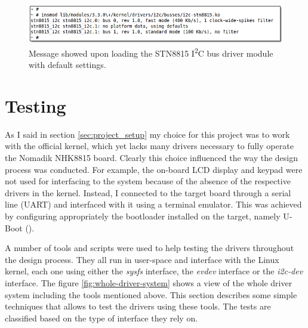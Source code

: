 \documentclass[a4paper,10pt]{article}
\newcommand{\icc}{I\textsuperscript{2}C }
\begin{document}
\begin{multicols}{2}
\begin{figure}
 \includegraphics[width=12.4cm, height=1.7cm]{./figures/dump-adapter-insmod.png}
 \caption{Message showed upon loading the STN8815 \icc bus driver module with
 	default settings.}
 \label{fig:i2c-adapter-insmod}
\end{figure}


\section{Testing}
\label{sec:testing}

As I said in section \ref{sec:project_setup} my choice for this project was
to work with the official kernel, which yet lacks many drivers necessary to
fully operate the Nomadik NHK8815 board. Clearly this choice influenced the
way the design process was conducted.
For example, the on-board LCD display and keypad were not used for interfacing
to the system because of the absence of the respective drivers in the kernel.
Instead, I connected to the target board through a serial line (UART) and
interfaced with it using a terminal emulator. This was achieved by configuring
appropriately the bootloader installed on the target, namely U-Boot
(\cite{uboot}).

A number of tools and scripts were used to help testing the drivers throughout
the design process. They all run in user-space and interface with the Linux
kernel, each one using either the \emph{sysfs} interface, the \emph{evdev}
interface or the \emph{i2c-dev} interface.
The figure \ref{fig:whole-driver-system} shows a view of the whole driver
system including the tools mentioned above.
This section describes some simple techniques that allows to test the drivers
using these tools. The tests are classified based on the type of interface 
they rely on.


\end{multicols}
\end{document}
